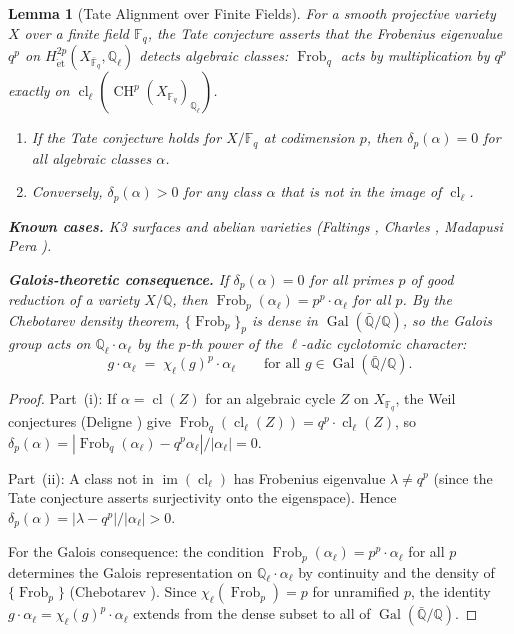 \documentclass[11pt]{article}
\newtheorem{lemma}[theorem]{Lemma}
\theoremstyle{definition}
\DeclareMathOperator{\cl}{cl}
\DeclareMathOperator{\Gal}{Gal}
\DeclareMathOperator{\Frob}{Frob}
\DeclareMathOperator{\CH}{CH}
\DeclareMathOperator{\im}{im}
\begin{document}
\begin{lemma}[Tate Alignment over Finite Fields]
\label{lem:tate-align}
For a smooth projective variety $X$ over a finite field $\mathbb{F}_q$,
the Tate conjecture asserts that the Frobenius eigenvalue $q^p$ on
$H^{2p}_{\mathrm{\acute{e}t}}(X_{\bar{\mathbb{F}}_q}, \mathbb{Q}_\ell)$
detects algebraic classes: $\Frob_q$ acts by multiplication by $q^p$
exactly on $\cl_\ell(\CH^p(X_{\mathbb{F}_q})_{\mathbb{Q}_\ell})$.

\begin{enumerate}[label=\textup{(\roman*)}]
  \item If the Tate conjecture holds for $X/\mathbb{F}_q$ at codimension
    $p$, then $\delta_p(\alpha) = 0$ for all algebraic classes
    $\alpha$.
  \item Conversely, $\delta_p(\alpha) > 0$ for any class $\alpha$ that
    is not in the image of $\cl_\ell$.
\end{enumerate}

\noindent\textbf{Known cases.}  K3 surfaces and abelian varieties
(Faltings \cite{Faltings}, Charles \cite{Charles},
Madapusi Pera \cite{MP}).

\smallskip\noindent\textbf{Galois-theoretic consequence.}
If $\delta_p(\alpha) = 0$ for all primes $p$ of good reduction of a
variety $X/\mathbb{Q}$, then
$\Frob_p(\alpha_\ell) = p^p \cdot \alpha_\ell$ for all $p$.
By the Chebotarev density theorem, $\{\Frob_p\}_p$ is dense in
$\Gal(\bar{\mathbb{Q}}/\mathbb{Q})$, so the Galois group acts on
$\mathbb{Q}_\ell \cdot \alpha_\ell$ by the $p$-th power of the
$\ell$-adic cyclotomic character:
\[
  g \cdot \alpha_\ell \;=\; \chi_\ell(g)^p \cdot \alpha_\ell
  \qquad \text{for all } g \in \Gal(\bar{\mathbb{Q}}/\mathbb{Q}).
\]
\end{lemma}

\begin{proof}
Part~(i): If $\alpha = \cl(Z)$ for an algebraic cycle $Z$ on
$X_{\mathbb{F}_q}$, the Weil conjectures (Deligne \cite{Deligne-Weil})
give $\Frob_q(\cl_\ell(Z)) = q^p \cdot \cl_\ell(Z)$, so
$\delta_p(\alpha) = |\Frob_q(\alpha_\ell) - q^p \alpha_\ell|/|\alpha_\ell| = 0$.

Part~(ii): A class not in $\im(\cl_\ell)$ has Frobenius eigenvalue
$\lambda \neq q^p$ (since the Tate conjecture asserts surjectivity onto
the eigenspace).  Hence $\delta_p(\alpha) = |\lambda - q^p|/|\alpha_\ell| > 0$.

For the Galois consequence: the condition
$\Frob_p(\alpha_\ell) = p^p \cdot \alpha_\ell$ for all $p$ determines
the Galois representation on $\mathbb{Q}_\ell \cdot \alpha_\ell$ by
continuity and the density of $\{\Frob_p\}$ (Chebotarev \cite{Cheb}).
Since $\chi_\ell(\Frob_p) = p$ for unramified $p$, the identity
$g \cdot \alpha_\ell = \chi_\ell(g)^p \cdot \alpha_\ell$ extends from
the dense subset to all of $\Gal(\bar{\mathbb{Q}}/\mathbb{Q})$.
\end{proof}
\end{document}
